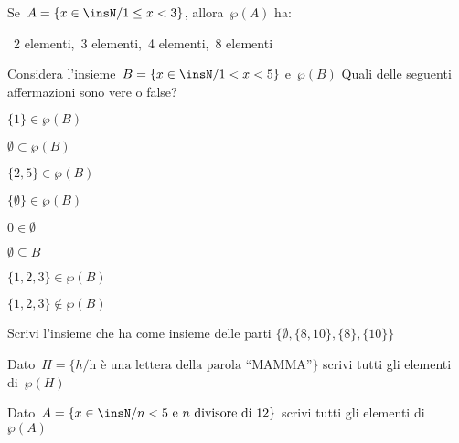 \begin{esercizio}
\label{ese:7.2}
Se~$A=\{x\in\insN/1\le x<3\}$, allora~$\wp (A)$ ha:
\begin{center}
\boxA\quad~2 elementi,\quad\boxB\quad~3 elementi,\quad\boxC\quad~4 
elementi,\quad\boxD\quad~8 elementi
\end{center}
\end{esercizio}

\begin{esercizio}
 \label{ese:7.3}
Considera l'insieme~$B=\{x\in\insN/1<x<5\}$
e~$\wp (B)$ Quali delle seguenti affermazioni sono vere o false?
\begin{multicols}{2}
\TabPositions{4cm}
\begin{enumeratea}
 \item $\{1\}\in\wp (B)$ \tab\boxV\quad\boxF
 \item $\emptyset\subset\wp (B)$ \tab\boxV\quad\boxF
 \item $\{2,5\}\in\wp (B)$ \tab\boxV\quad\boxF
 \item $\{\emptyset\}\in\wp (B)$ \tab\boxV\quad\boxF
 \item $0\in\emptyset $ \tab\boxV\quad\boxF
 \item $\emptyset\subseteq B$ \tab\boxV\quad\boxF
 \item $\{1,2,3\}\in\wp (B)$ \tab\boxV\quad\boxF
 \item $\{1,2,3\}\notin\wp (B)$ \tab\boxV\quad\boxF
\end{enumeratea}
\end{multicols}
\end{esercizio}

\begin{esercizio}
 \label{ese:7.4}
 Scrivi l'insieme che ha come insieme delle parti
$\{\emptyset,\{8,10\},\{8\},\{10\}\}$
\end{esercizio}

\begin{esercizio}
 \label{ese:7.5}
Dato~$H=\{h/\text{h è una lettera della parola ``MAMMA''}\}$ scrivi
tutti gli elementi di~$\wp (H)$
\end{esercizio}

\begin{esercizio}
 \label{ese:7.6}
 Dato~$A=\{x\in\insN/ n<5\text{ e }n\text{ divisore di~12}\}$ scrivi tutti gli 
elementi di
$\wp (A)$
\end{esercizio}


